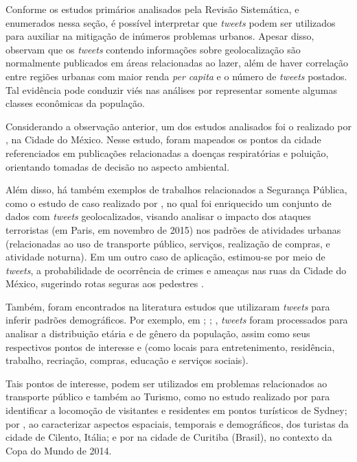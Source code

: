 \documentclass[
	12pt,				%
	oneside,			%
	a4paper,			%
	english,			%
	brazil				%
	]{abntex2ppgsi}
\begin{document}
{{Conforme os estudos primários analisados pela Revisão Sistemática, e enumerados nessa seção, é possível interpretar que \textit{tweets} podem ser utilizados para auxiliar na mitigação de inúmeros problemas urbanos. Apesar disso, \cite{Chaniotakis2015} observam que os \textit{tweets} contendo informações sobre geolocalização são normalmente publicados em áreas relacionadas ao lazer, além de haver correlação entre regiões urbanas com maior renda \textit{per capita} e o número de \textit{tweets} postados. Tal evidência pode conduzir viés nas análises por representar somente algumas classes econômicas da população. 

Considerando a observação anterior, um dos estudos analisados foi o realizado por \cite{Zagal2016}, na Cidade do México. Nesse estudo, foram mapeados os pontos da cidade referenciados em publicações relacionadas a doenças respiratórias e poluição, orientando tomadas de decisão no aspecto ambiental. 

Além disso, há também exemplos de trabalhos relacionados a Segurança Pública, como o estudo de caso realizado por \cite{Wen2016}, no qual foi enriquecido um conjunto de dados com \textit{tweets} geolocalizados, visando analisar o impacto dos ataques terroristas (em Paris, em novembro de 2015) nos padrões de atividades urbanas (relacionadas ao uso de transporte público, serviços, realização de compras, e atividade noturna). Em um outro caso de aplicação, estimou-se por meio de \textit{tweets}, a probabilidade de ocorrência de crimes e ameaças nas ruas da Cidade do México, sugerindo rotas seguras aos pedestres \cite{Mata2015}.

Também, foram encontrados na literatura estudos que utilizaram \textit{tweets} para inferir padrões demográficos. Por exemplo, em \cite{Farseev2015}; \cite{Gkiotsalitis2015}; \cite{Gkiotsalitis2016}, \textit{tweets} foram processados para analisar a distribuição etária e de gênero da população, assim como seus respectivos pontos de interesse \cite{Hasan2014} e \cite{Maghrebi2015} (como locais para entretenimento, residência, trabalho, recriação, compras, educação e serviços sociais). 

Tais pontos de interesse, podem ser utilizados em problemas relacionados ao transporte público \cite{Gutev2016} e também ao Turismo, como no estudo realizado por \cite{Abbasi2015} para identificar a locomoção de visitantes e residentes em pontos turísticos de Sydney; por \cite{Chua2016}, ao caracterizar aspectos espaciais, temporais e demográficos, dos turistas da cidade de Cilento, Itália; e por \cite{Thomaz2016} na cidade de Curitiba (Brasil), no contexto da Copa do Mundo de 2014.

}}
\end{document}
